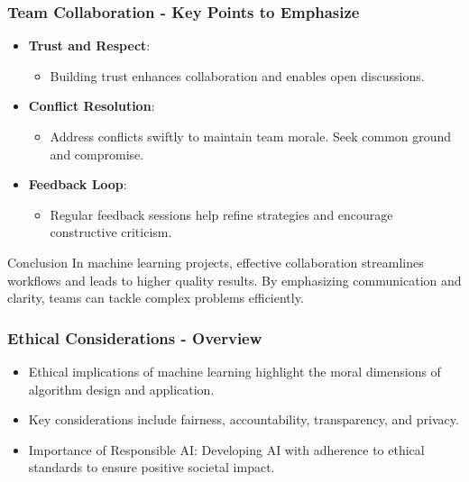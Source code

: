 \documentclass[aspectratio=169]{beamer}
\begin{document}
\begin{frame}[fragile]
    \frametitle{Team Collaboration - Key Points to Emphasize}
    \begin{itemize}
        \item \textbf{Trust and Respect}:
        \begin{itemize}
            \item Building trust enhances collaboration and enables open discussions.
        \end{itemize}

        \item \textbf{Conflict Resolution}:
        \begin{itemize}
            \item Address conflicts swiftly to maintain team morale. Seek common ground and compromise.
        \end{itemize}
        
        \item \textbf{Feedback Loop}:
        \begin{itemize}
            \item Regular feedback sessions help refine strategies and encourage constructive criticism.
        \end{itemize}
    \end{itemize}
    
    \begin{block}{Conclusion}
        In machine learning projects, effective collaboration streamlines workflows and leads to higher quality results.
        By emphasizing communication and clarity, teams can tackle complex problems efficiently.
    \end{block}
\end{frame}

\begin{frame}[fragile]
  \frametitle{Ethical Considerations - Overview}
  \begin{itemize}
    \item Ethical implications of machine learning highlight the moral dimensions of algorithm design and application.
    \item Key considerations include fairness, accountability, transparency, and privacy.
    \item Importance of Responsible AI: Developing AI with adherence to ethical standards to ensure positive societal impact.
  \end{itemize}
\end{frame}
\end{document}
